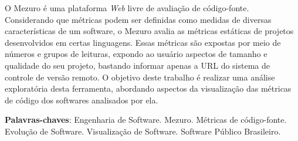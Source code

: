 \begin{resumo}
 O Mezuro é uma plataforma \textit{Web} livre de avaliação de código-fonte.
 Considerando que métricas podem ser definidas como medidas de diversas
 características de um software, o Mezuro avalia as métricas estáticas de
 projetos desenvolvidos em certas linguagens. Essas métricas são expostas por
 meio de números e grupos de leituras, expondo ao usuário aspectos de tamanho e
 qualidade do seu projeto, bastando informar apenas a URL do sistema de controle
 de versão remoto.
 O objetivo deste trabalho é realizar uma análise exploratória desta ferramenta,
 abordando aspectos da visualização das métricas de código dos softwares
 analisados por ela.

 \vspace{\onelineskip}

 \noindent
 \textbf{Palavras-chaves}: Engenharia de Software. Mezuro.
 Métricas de código-fonte. Evolução de Software. Visualização de Software.
 Software Público Brasileiro.
\end{resumo}
